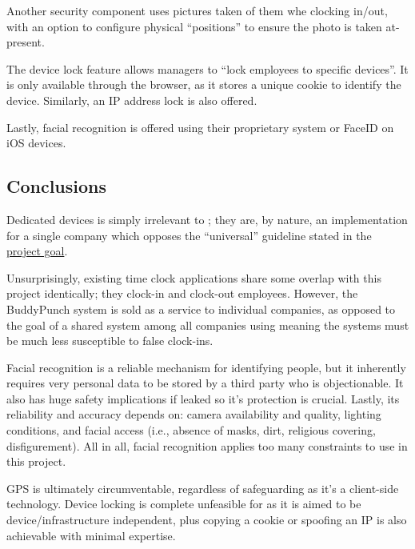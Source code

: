 Another security component uses pictures taken of them whe
clocking in/out, with an option to configure physical
\enquote{positions} to ensure the photo is taken
at-present.

The device lock feature allows managers to \enquote{lock
  employees to specific devices}.
It is only available through the browser, as it stores a
unique cookie to identify the device.
Similarly, an IP address lock is also offered.

Lastly, facial recognition is offered using their
proprietary system or FaceID on iOS devices.

\subsection{Conclusions}

Dedicated devices is simply irrelevant to \projectname{};
they are, by nature, an implementation for a single company
which opposes the \enquote{universal} guideline stated in
the \hyperref[ss:goal]{project goal}.

Unsurprisingly, existing time clock applications share some
overlap with this project identically; they clock-in and
clock-out employees.
However, the BuddyPunch system is sold as a service to
individual companies, as opposed to the goal of a shared
system among all companies using \projectname{} meaning the
systems must be much less susceptible to false clock-ins.

Facial recognition is a reliable mechanism for identifying
people, but it inherently requires very personal data to be
stored by a third party who is objectionable. It also has
huge safety implications if leaked so it's protection is
crucial. Lastly, its reliability and accuracy depends on:
camera availability and quality, lighting conditions, and
facial access (i.e., absence of masks, dirt, religious
covering, disfigurement). All in all, facial recognition
applies too many constraints to use in this project.

GPS is ultimately circumventable, regardless of safeguarding
as it's a client-side technology. Device locking is complete
unfeasible for \projectname{} as it is aimed to be
device/infrastructure independent, plus copying a cookie or
spoofing an IP is also achievable with minimal expertise. 

